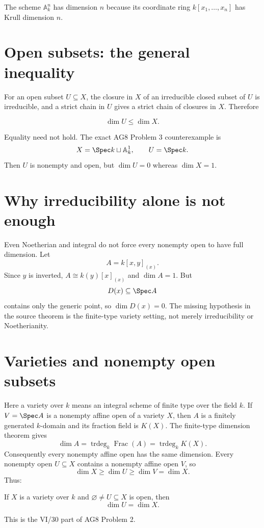 \begin{example}\label{ex:vi30-expand-01}
The scheme $\mathbb A^n_k$ has dimension $n$ because its coordinate ring $k[x_1,\ldots,x_n]$ has Krull dimension $n$.
\end{example}
\section{Open subsets: the general inequality}\label{sec:vi30-open-inequality}
For an open subset $U\subseteq X$, the closure in $X$ of an irreducible closed subset of $U$ is irreducible, and a
strict chain in $U$ gives a strict chain of closures in $X$.  Therefore
\begin{proposition}\label{prop:vi30-open-inequality}
\[
\dim U\leq\dim X.
\]
\end{proposition}
Equality need not hold.  The exact AG8 Problem 3 counterexample is
\[
X=\Spec k\sqcup\mathbb A^1_k,\qquad U=\Spec k.
\]
Then $U$ is nonempty and open, but $\dim U=0$ whereas $\dim X=1$.


\section{Why irreducibility alone is not enough}\label{sec:vi30-irreducible-warning}
Even Noetherian and integral do not force every nonempty open to have full dimension.  Let
\[
A=k[x,y]_{(x)}.
\]
Since $y$ is inverted, $A\cong k(y)[x]_{(x)}$ and $\dim A=1$.  But
\[
D(x)\subseteq\Spec A
\]
contains only the generic point, so $\dim D(x)=0$.  The missing hypothesis in the source theorem is the finite-type
variety setting, not merely irreducibility or Noetherianity.


\section{Varieties and nonempty open subsets}\label{sec:vi30-variety-open}
Here a variety over $k$ means an integral scheme of finite type over the field $k$.  If $V=\Spec A$ is a nonempty
affine open of a variety $X$, then $A$ is a finitely generated $k$-domain and its fraction field is $K(X)$.
The finite-type dimension theorem gives
\[
\dim A=\operatorname{trdeg}_k\operatorname{Frac}(A)
       =\operatorname{trdeg}_kK(X).
\]
Consequently every nonempty affine open has the same dimension.  Every nonempty open $U\subseteq X$ contains a
nonempty affine open $V$, so
\[
\dim X\geq\dim U\geq\dim V=\dim X.
\]
Thus:
\begin{theorem}\label{thm:vi30-open-variety}
If $X$ is a variety over $k$ and $\varnothing\neq U\subseteq X$ is open, then
\[
\dim U=\dim X.
\]
\end{theorem}
This is the VI/30 part of AG8 Problem 2.


